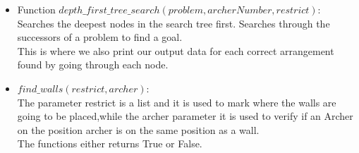 \documentclass{article}
\begin{document}
\begin{enumerate}
\begin{itemize}
\begin{itemize}
       \end{itemize}
       \item Function $depth\_first\_tree\_search(problem,archerNumber,restrict):$
       \\Searches the deepest nodes in the search tree first.
        Searches through the successors of a problem to find a goal.
        \\This is where we also print our output data for each correct arrangement found by going through each node.
       \item $find\_walls(restrict,archer):$
         \\The parameter restrict is a list and it is used to mark where the walls are going to be placed,while the archer parameter it is used to verify if an Archer on the position archer is on the same position as a wall.
         \\The functions either returns True or False.
   

\end{itemize}
\end{enumerate}
\end{document}
